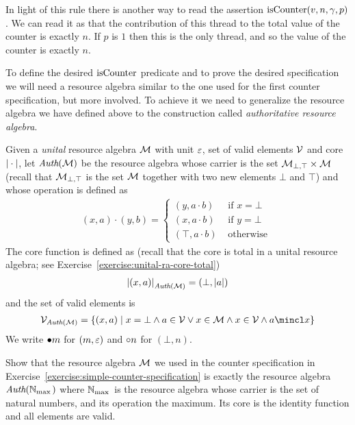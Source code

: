 In light of this rule there is another way to read the assertion $\operatorname{isCounter}(v, n, \gamma, p)$.
We can read it as that the contribution of this thread to the total value of the counter is exactly $n$.
If $p$ is $1$ then this is the only thread, and so the value of the counter is exactly $n$.

To define the desired $\operatorname{isCounter}$ predicate and to prove the desired specification we will need a resource algebra similar to the one used for the first counter specification, but more involved.
To achieve it we need to generalize the resource algebra we have defined above to the construction called \emph{authoritative resource algebra}.

\begin{example}
  \label{example:authoritative-RA}
  Given a \emph{unital} resource algebra $\mathcal{M}$ with unit $\varepsilon$, set of valid elements $\mathcal{V}$ and core ${\mid}\cdot{\mid}$, let $\textit{Auth}(\mathcal{M})$ be the resource algebra whose carrier is the set $\mathcal{M}_{\bot,\top} \times \mathcal{M}$ (recall that $\mathcal{M}_{\bot,\top}$ is the set $\mathcal{M}$ together with two new elements $\bot$ and $\top$) and whose operation is defined as
  \begin{align*}
    (x, a) \cdot (y, b) =
    \begin{cases}
      (y, a \cdot b) & \text{ if } x = \bot\\
      (x, a \cdot b) & \text{ if } y = \bot\\
      (\top, a \cdot b) & \text{ otherwise }
    \end{cases}
  \end{align*}
  The core function is defined as (recall that the core is total in a unital resource algebra; see Exercise~\ref{exercise:unital-ra-core-total})
  \begin{align*}
    {\mid}(x, a){\mid}_{\textit{Auth}(\mathcal{M})} = \left(\bot, {\mid}a{\mid}\right)
  \end{align*}
  and the set of valid elements is
  \begin{align*}
    \Vl_{\authm(\Ml)} = \left\{(x, a) \isetsep x = \bot \land a \in \Vl \lor x \in \Ml \land x \in \Vl \land  a \mincl x\right\}
  \end{align*}
  We write $\mathord{\bullet} m$ for $(m,\varepsilon)$ and $\mathord{\circ} n$ for $(\bot,n)$.
\end{example}
\begin{exercise}
  Show that the resource algebra $\mathcal{M}$ we used in the counter specification in Exercise~\ref{exercise:simple-counter-specification} is exactly the resource algebra $\textit{Auth}(\mathbb{N}_{\max{}})$ where $\mathbb{N}_{\max{}}$ is the resource algebra whose carrier is the set of natural numbers, and its operation the maximum.
  Its core is the identity function and all elements are valid.
\end{exercise}


